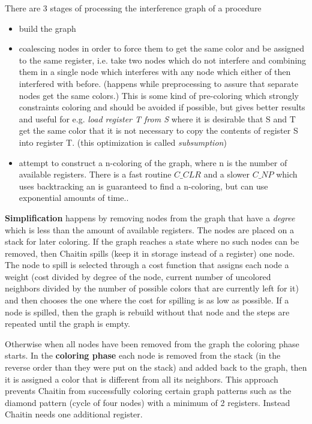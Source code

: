 \documentclass[a4paper,10pt]{article}
\begin{document}
There are 3 stages of processing the interference graph of a procedure
\begin{itemize}
	\item build the graph
    \item coalescing nodes in order to force them to get the same color and be assigned to the same register, i.e. take two nodes which do not interfere and combining them in a single node which interferes with any node which either of then interfered with before. (happens while preprocessing to assure that separate nodes get the same colors.) This is some kind of pre-coloring which strongly constraints coloring and should be avoided if possible, but gives better results and useful for e.g. \textit{load register T from S} where it is desirable that S and T get the same color that it is not necessary to copy the contents of register S into register T. (this optimization is called \textit{subsumption})
    \item attempt to construct a n-coloring of the graph, where n is the number of available registers. There is a fast routine $C\_CLR$ and a slower $C\_NP$ which uses backtracking an is guaranteed to find a n-coloring, but can use exponential amounts of time..
\end{itemize}

\textbf{Simplification} happens by removing nodes from the graph that have a \textit{degree} which is less than the amount of available registers. The nodes are placed on a stack for later coloring. If the graph reaches a state where no such nodes can be removed, then Chaitin spills (keep it in storage instead of a register) one node. The node to spill is selected through a cost function that assigns each node a weight (cost divided by degree of the node, current number of uncolored neighbors divided by the number of possible colors that are currently left for it) and then chooses the one where the cost for spilling is as low as possible. If a node is spilled, then the graph is rebuild without that node and the steps are repeated until the graph is empty.

Otherwise when all nodes have been removed from the graph the coloring phase starts. In the \textbf{coloring phase} each node is removed from the stack (in the reverse order than they were put on the stack) and added back to the graph, then it is assigned a color that is different from all its neighbors. This approach prevents Chaitin from successfully coloring certain graph patterns such as the diamond pattern (cycle of four nodes) with a minimum of 2 registers. Instead Chaitin needs one additional register.\\
\end{document}
